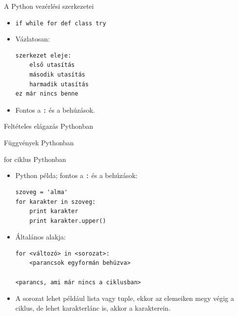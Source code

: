 \begin{frame}[fragile]
  {A Python vezérlési szerkezetei}
  \begin{itemize}
    \item <+-| alert@+> \verb!if while for def class try!
    \item <+-| alert@+> Vázlatosan:
\begin{Verbatim}[frame=single]
szerkezet eleje:
    első utasítás
    második utasítás
    harmadik utasítás
ez már nincs benne
\end{Verbatim}
    \item <+-| alert@+> Fontos a \verb!:! és a behúzások.
  \end{itemize}
\end{frame}

\begin{frame}[fragile]
  {Feltételes elágazás Pythonban}
      
\end{frame}

\begin{frame}[fragile]
  {Függvények Pythonban}
  \small
      
\end{frame}

%       

\begin{frame}[fragile]
  {for ciklus Pythonban}
  \begin{itemize}
    \item <+-| alert@+> Python példa; fontos a \verb!:! és a behúzások:
\begin{Verbatim}[frame=single]
szoveg = 'alma'
for karakter in szoveg:
    print karakter
    print karakter.upper()
\end{Verbatim}
    \item <+-| alert@+> Általános alakja:
\begin{Verbatim}[frame=single]
for <változó> in <sorozat>:
    <parancsok egyformán behúzva>

<parancs, ami már nincs a ciklusban>
\end{Verbatim}
    \item <+-| alert@+> A sorozat lehet például lista vagy tuple, ekkor az
elemeiken megy végig a ciklus, de lehet karakterlánc is, akkor a
karakterein.
  \end{itemize}
\end{frame}

